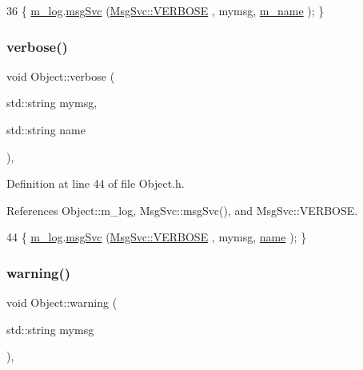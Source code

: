 \begin{DoxyCode}
36 \{ \hyperlink{classObject_a0d269813dd7ac1f24bc143031e2963f2}{m\_log}.\hyperlink{classMsgSvc_ad25f18047920cc59a314e5098259711c}{msgSvc} (\hyperlink{classMsgSvc_ae671eb7301996cd049d2da8a65925926af655256b06494ade5ba830abe5401ec9}{MsgSvc::VERBOSE} , mymsg, \hyperlink{classObject_a8b83c95c705d2c3ba0d081fe1710f48d}{m\_name} ); \}
\end{DoxyCode}
\mbox{\label{classObject_a2d4120195317e2a3c6532e8bb9f3da68}} 
\subsubsection{\texorpdfstring{verbose()}{verbose()}\hspace{0.1cm}{\footnotesize\ttfamily [2/2]}}
{\footnotesize\ttfamily void Object\+::verbose (\begin{DoxyParamCaption}\item[{std\+::string}]{mymsg,  }\item[{std\+::string}]{name }\end{DoxyParamCaption})\hspace{0.3cm}{\ttfamily [inline]}, {\ttfamily [inherited]}}



Definition at line 44 of file Object.\+h.



References Object\+::m\+\_\+log, Msg\+Svc\+::msg\+Svc(), and Msg\+Svc\+::\+V\+E\+R\+B\+O\+SE.


\begin{DoxyCode}
44 \{ \hyperlink{classObject_a0d269813dd7ac1f24bc143031e2963f2}{m\_log}.\hyperlink{classMsgSvc_ad25f18047920cc59a314e5098259711c}{msgSvc} (\hyperlink{classMsgSvc_ae671eb7301996cd049d2da8a65925926af655256b06494ade5ba830abe5401ec9}{MsgSvc::VERBOSE} , mymsg, \hyperlink{classObject_a300f4c05dd468c7bb8b3c968868443c1}{name} ); \}
\end{DoxyCode}
\mbox{\label{classObject_a65cd4fda577711660821fd2cd5a3b4c9}} 
\subsubsection{\texorpdfstring{warning()}{warning()}\hspace{0.1cm}{\footnotesize\ttfamily [1/2]}}
{\footnotesize\ttfamily void Object\+::warning (\begin{DoxyParamCaption}\item[{std\+::string}]{mymsg }\end{DoxyParamCaption})\hspace{0.3cm}{\ttfamily [inline]}, {\ttfamily [inherited]}}



